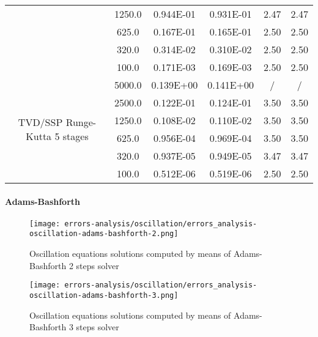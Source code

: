 \documentclass[pdftex,preprint,3p,times,numbers]{elsarticle}
\begin{document}
\begin{table}[!ht]
{\begin{tabular}{cccccc}
                 &   1250.0        &  0.944E-01    &  0.931E-01     & 2.47         & 2.47          \\
                 &    625.0        &  0.167E-01    &  0.165E-01     & 2.50         & 2.50          \\
                 &    320.0        &  0.314E-02    &  0.310E-02     & 2.50         & 2.50          \\
                 &    100.0        &  0.171E-03    &  0.169E-03     & 2.50         & 2.50          \\
    \cmidrule{2-6}
    \multirow{6}{*}{TVD/SSP Runge-Kutta 5 stages}
                 &   5000.0        &  0.139E+00    &  0.141E+00     & /            & /             \\
                 &   2500.0        &  0.122E-01    &  0.124E-01     & 3.50         & 3.50          \\
                 &   1250.0        &  0.108E-02    &  0.110E-02     & 3.50         & 3.50          \\
                 &    625.0        &  0.956E-04    &  0.969E-04     & 3.50         & 3.50          \\
                 &    320.0        &  0.937E-05    &  0.949E-05     & 3.47         & 3.47          \\
                 &    100.0        &  0.512E-06    &  0.519E-06     & 2.50         & 2.50          \\
    \bottomrule
  \end{tabular}}
\end{table}

\paragraph{Adams-Bashforth}

\begin{figure}[!ht]
  \centering
  \texttt{[image: errors-analysis/oscillation/errors\_analysis-oscillation-adams-bashforth-2.png]}
  \caption{Oscillation equations solutions computed by means of Adams-Bashforth 2 steps solver}\label{fig:results-oscillation-adams-bashforth-2}
\end{figure}

\begin{figure}[!ht]
  \centering
  \texttt{[image: errors-analysis/oscillation/errors\_analysis-oscillation-adams-bashforth-3.png]}
  \caption{Oscillation equations solutions computed by means of Adams-Bashforth 3 steps solver}\label{fig:results-oscillation-adams-bashforth-3}
\end{figure}
\end{document}
